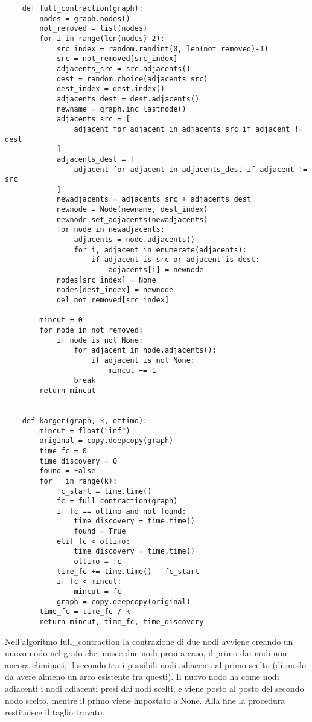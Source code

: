 \begin{verbatim}
    def full_contraction(graph):
        nodes = graph.nodes()
        not_removed = list(nodes)
        for i in range(len(nodes)-2):
            src_index = random.randint(0, len(not_removed)-1)
            src = not_removed[src_index]
            adjacents_src = src.adjacents()
            dest = random.choice(adjacents_src)
            dest_index = dest.index()
            adjacents_dest = dest.adjacents()
            newname = graph.inc_lastnode()
            adjacents_src = [
                adjacent for adjacent in adjacents_src if adjacent != dest
            ]
            adjacents_dest = [
                adjacent for adjacent in adjacents_dest if adjacent != src
            ]
            newadjacents = adjacents_src + adjacents_dest
            newnode = Node(newname, dest_index)
            newnode.set_adjacents(newadjacents)
            for node in newadjacents:
                adjacents = node.adjacents()
                for i, adjacent in enumerate(adjacents):
                    if adjacent is src or adjacent is dest:
                        adjacents[i] = newnode
            nodes[src_index] = None
            nodes[dest_index] = newnode
            del not_removed[src_index]

        mincut = 0
        for node in not_removed:
            if node is not None:
                for adjacent in node.adjacents():
                    if adjacent is not None:
                        mincut += 1
                break
        return mincut


    def karger(graph, k, ottimo):
        mincut = float("inf")
        original = copy.deepcopy(graph)
        time_fc = 0
        time_discovery = 0
        found = False
        for _ in range(k):
            fc_start = time.time()
            fc = full_contraction(graph)
            if fc == ottimo and not found:
                time_discovery = time.time()
                found = True
            elif fc < ottimo:
                time_discovery = time.time()
                ottimo = fc
            time_fc += time.time() - fc_start
            if fc < mincut:
                mincut = fc
            graph = copy.deepcopy(original)
        time_fc = time_fc / k
        return mincut, time_fc, time_discovery

\end{verbatim}



\clearpage

Nell'algoritmo full\_contraction la contrazione di due nodi avviene creando un nuovo nodo nel grafo che unisce due nodi presi a caso, il primo dai nodi non ancora eliminati, il secondo tra i possibili nodi adiacenti al primo scelto (di modo da avere almeno un arco esistente tra questi).
Il nuovo nodo ha come nodi adiacenti i nodi adiacenti presi dai nodi scelti, e viene posto al posto del secondo nodo scelto, mentre il primo viene impostato a None.
Alla fine la procedura restituisce il taglio trovato.

